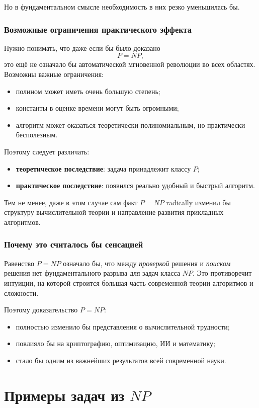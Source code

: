 \documentclass[12pt,a4paper]{article}
\theoremstyle{definition}
\theoremstyle{plain}
\begin{document}
Но в фундаментальном смысле необходимость в них резко уменьшилась бы.

\subsubsection{Возможные ограничения практического эффекта}
Нужно понимать, что даже если бы было доказано
\[
P=NP,
\]
это ещё не означало бы автоматической мгновенной революции во всех областях. Возможны важные ограничения:
\begin{itemize}
\item полином может иметь очень большую степень;
\item константы в оценке времени могут быть огромными;
\item алгоритм может оказаться теоретически полиномиальным, но практически бесполезным.
\end{itemize}

Поэтому следует различать:
\begin{itemize}
\item \textbf{теоретическое последствие}: задача принадлежит классу $P$;
\item \textbf{практическое последствие}: появился реально удобный и быстрый алгоритм.
\end{itemize}

Тем не менее, даже в этом случае сам факт $P=NP$ radically изменил бы структуру вычислительной теории и направление развития прикладных алгоритмов.

\subsubsection{Почему это считалось бы сенсацией}
Равенство $P=NP$ означало бы, что между \textit{проверкой} решения и \textit{поиском} решения нет фундаментального разрыва для задач класса $NP$. Это противоречит интуиции, на которой строится большая часть современной теории алгоритмов и сложности.

Поэтому доказательство $P=NP$:
\begin{itemize}
\item полностью изменило бы представления о вычислительной трудности;
\item повлияло бы на криптографию, оптимизацию, ИИ и математику;
\item стало бы одним из важнейших результатов всей современной науки.
\end{itemize}

\section{Примеры задач из \texorpdfstring{$NP$}{NP}}
\end{document}
